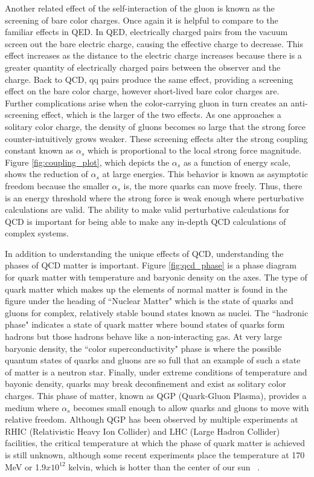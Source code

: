 Another related effect of the self-interaction of the gluon is known as the screening of bare color charges. 
Once again it is helpful to compare to the familiar effects in QED. In QED, electrically charged pairs from the vacuum screen out the bare electric charge, causing
the effective charge to decrease. This effect increases as the distance to the electric charge increases because there is a greater quantity of electrically charged pairs between the observer and the charge. Back to QCD, qq pairs produce the same effect, providing a screening effect on the bare color charge, however short-lived bare color charges are. Further complications arise when the color-carrying gluon in turn creates an anti-screening effect, which is the larger of the two effects. As one approaches a solitary color charge, the density of gluons becomes so large that the strong force counter-intuitively grows weaker. These screening effects alter the strong coupling constant known as $\alpha_s$ which is proportional to the local strong force magnitude. Figure \ref{fig:coupling_plot}, which depicts the $\alpha_s$ as a function of energy scale, shows the reduction of $\alpha_s$ at large energies. This behavior is known as asymptotic freedom because the smaller $\alpha_s$ is, the more quarks can move freely. Thus, there is an energy threshold where the strong force is weak enough where perturbative calculations are valid. The ability to make valid perturbative calculations for QCD is important for being able to make any in-depth QCD calculations of complex systems.

In addition to understanding the unique effects of QCD, understanding the phases of QCD matter is important. Figure \ref{fig:qcd_phase} is a phase diagram for quark matter with temperature  and baryonic density on the axes. The type of quark matter which makes up the elements of normal matter is found in the figure under the heading of ``Nuclear Matter" which is the state of quarks and gluons for complex, relatively stable bound states known as nuclei. The ``hadronic phase" indicates a state of quark matter where bound states of quarks form hadrons but those hadrons behave like a non-interacting gas. At very large baryonic density, the ``color superconductivity" phase is where the possible quantum states of quarks and gluons are so full that an example of such a state of matter is a neutron star. Finally, under extreme conditions of temperature and bayonic density, quarks may break deconfinement and exist as solitary color charges. This phase of matter, known as QGP (Quark-Gluon Plasma), provides a medium where $\alpha_s$ becomes small enough to allow quarks and gluons to move with relative freedom. Although QGP has been observed by multiple experiments at RHIC (Relativistic Heavy Ion Collider) and LHC (Large Hadron Collider) facilities, the critical temperature at which the phase of quark matter is achieved is still unknown, although some recent experiments place the temperature at 170 MeV or 1.9$x10^{12}$ kelvin, which is hotter than the center of our sun ~\cite{doi:10.1142/9789814689304_0031}.

